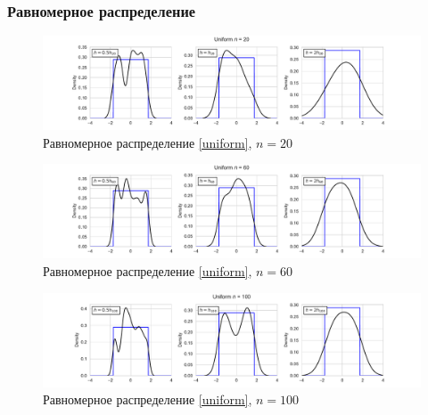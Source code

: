 \documentclass[a4paper]{article}
\begin{document}
\subsubsection{Равномерное распределение}
\begin{figure}[H]
    \centering
    \includegraphics[width = 16 cm]{resources/unifKde20.pdf}
    \caption{Равномерное распределение \eqref{uniform}, $n = 20$}
    \label{fig:uniformKDE20}
\end{figure}
\begin{figure}[H]
    \centering
    \includegraphics[width = 16 cm]{resources/unifKde60.pdf}
    \caption{Равномерное распределение \eqref{uniform}, $n = 60$}
    \label{fig:uniformKDE60}
\end{figure}
\begin{figure}[H]
    \centering
    \includegraphics[width = 16 cm]{resources/unifKde100.pdf}
    \caption{Равномерное распределение \eqref{uniform}, $n = 100$}
    \label{fig:uniformKDE100}
\end{figure}
\end{document}
